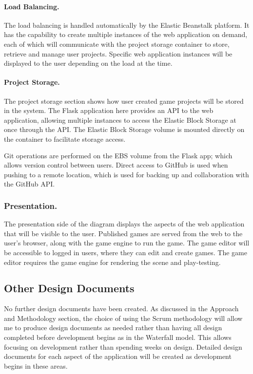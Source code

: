 \documentclass[a4paper, 12pt]{article}
\begin{document}
\paragraph{Load Balancing.}
The load balancing is handled automatically by the Elastic Beanstalk platform. It has the capability to create multiple instances of the web application on demand, each of which will communicate with the project storage container to store, retrieve and manage user projects. Specific web application instances will be displayed to the user depending on the load at the time.

\paragraph{Project Storage.}
The project storage section shows how user created game projects will be stored in the system. The Flask application here provides an API to the web application, allowing multiple instances to access the Elastic Block Storage at once through the API. The Elastic Block Storage volume is mounted directly on the container to facilitate storage access.

Git operations are performed on the EBS volume from the Flask app; which allows version control between users. Direct access to GitHub is used when pushing to a remote location, which is used for backing up and collaboration with the GitHub API.

\subsubsection{Presentation.}
The presentation side of the diagram displays the aspects of the web application that will be visible to the user. Published games are served from the web to the user's browser, along with the game engine to run the game. The game editor will be accessible to logged in users, where they can edit and create games. The game editor requires the game engine for rendering the scene and play-testing.

\subsection{Other Design Documents}
No further design documents have been created. As discussed in the Approach and Methodology section, the choice of using the Scrum methodology will allow me to produce design documents as needed rather than having all design completed before development begins as in the Waterfall model. This allows focusing on development rather than spending weeks on design. Detailed design documents for each aspect of the application will be created as development begins in these areas.
\end{document}
